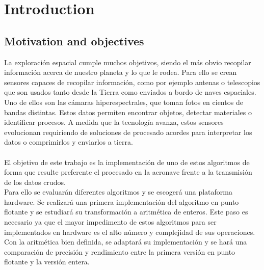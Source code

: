 \cleardoublepage
\chapter{Introduction}
\label{makereference}

\section{Motivation and objectives}

La exploración espacial cumple muchos objetivos, siendo el más obvio recopilar información acerca de nuestro planeta y lo que le rodea. Para ello se crean sensores capaces de recopilar información, como por ejemplo antenas o telescopios que son usados tanto desde la Tierra como enviados a bordo de naves espaciales. Uno de ellos son las cámaras hiperespectrales, que toman fotos en cientos de bandas distintas. Estos datos permiten encontrar objetos, detectar materiales o identificar procesos. A medida que la tecnología avanza, estos sensores evolucionan requiriendo de soluciones de procesado acordes para interpretar los datos o comprimirlos y enviarlos a tierra.
\\
\\
El objetivo de este trabajo es la implementación de uno de estos algoritmos de forma que resulte preferente el procesado en la aeronave frente a la transmisión de los datos crudos.
\\
Para ello se evaluarán diferentes algoritmos y se escogerá una plataforma hardware. Se realizará una primera implementación del algoritmo en punto flotante y se estudiará su transformación a aritmética de enteros. Este paso es necesario ya que el mayor impedimento de estos algoritmos para ser implementados en hardware es el alto número y complejidad de sus operaciones. Con la aritmética bien definida, se adaptará su implementación y se hará una comparación de precisión y rendimiento entre la primera versión en punto flotante y la versión entera.

